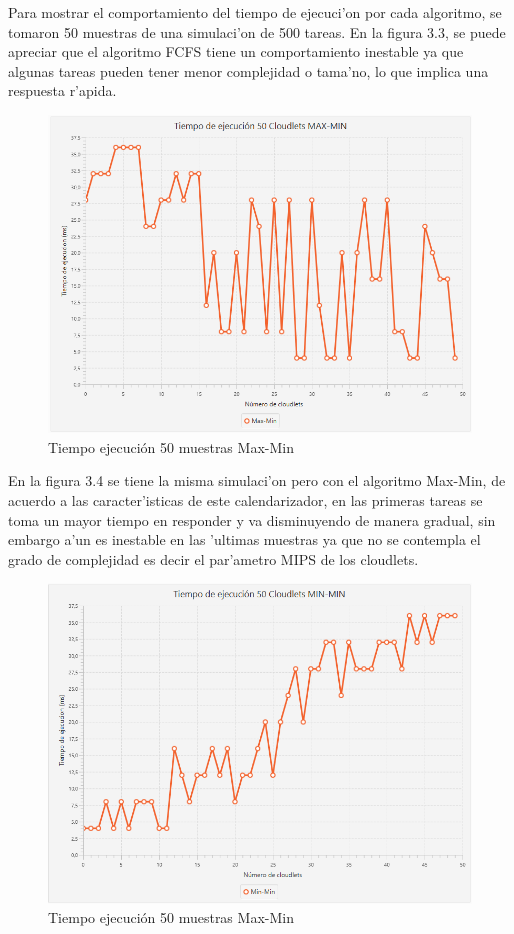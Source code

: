 \bigskip
Para mostrar el comportamiento del tiempo de ejecuci'on por cada algoritmo, se tomaron 50 muestras de una simulaci'on de 500 tareas. En la figura 3.3, se puede apreciar que el algoritmo FCFS tiene un comportamiento inestable ya que algunas tareas pueden tener menor complejidad o tama'no, lo que implica una respuesta r'apida.

\begin{figure}
	\caption{Tiempo ejecución 50 muestras Max-Min}
	\centering
	\includegraphics[scale=0.5]{media/max-min}
\end{figure}

\bigskip
 En la figura 3.4 se tiene la misma simulaci'on pero con el algoritmo Max-Min, de acuerdo a las caracter'isticas de este calendarizador, en las primeras tareas se toma un mayor tiempo en responder y va disminuyendo de manera gradual, sin embargo a'un es inestable en las 'ultimas muestras ya que no se contempla el grado de complejidad es decir el par'ametro MIPS de los cloudlets.

\begin{figure}
	\caption{Tiempo ejecución 50 muestras Max-Min}
	\centering
	\includegraphics[scale=0.5]{media/min-min}
\end{figure}

